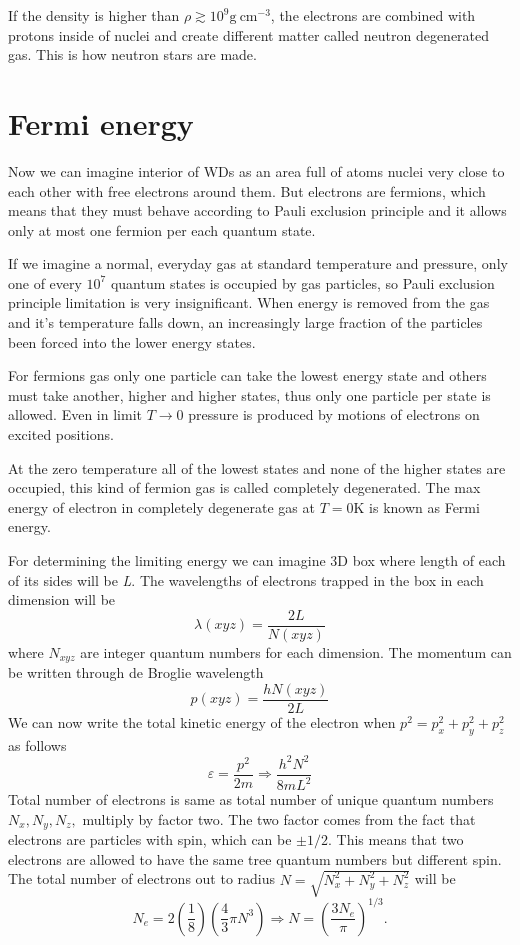 \documentclass[oneside,a4paper,11pt]{report}
\begin{document}
If the density is higher than $\rho \gtrsim 10^9 \mathrm{g\:cm^{-3}} $, the electrons are combined with protons inside of nuclei and 
create different matter called neutron degenerated gas. This is how neutron stars are made.    
 
\section{Fermi energy}
Now we can imagine interior of WDs as an area full of atoms nuclei very close to each other 
with free electrons around them. But electrons are fermions, which means that they must 
behave according to Pauli exclusion principle and it allows only at most one fermion 
per each quantum state. 

If we imagine a normal, everyday gas at standard temperature and pressure, only one 
of every $10^7$ quantum states is occupied by gas particles, so Pauli exclusion 
principle limitation is very insignificant. When energy is removed from the gas and 
it's temperature falls down, an increasingly large fraction of  the particles been 
forced into the lower energy states.

For fermions gas only one particle can take the lowest energy state and others must 
take another, higher and higher states, thus only one particle per state is allowed. 
Even in limit $T\rightarrow0$ pressure is produced by motions of electrons on excited positions.       

At the zero temperature all of the lowest states and none of the higher states are 
occupied, this kind of fermion gas is called completely degenerated. 
The max energy of electron in completely degenerate gas at $T=0 \mathrm{K}$ is known as Fermi energy. 

For determining the limiting energy we can imagine 3D box where length of each of its sides will be \textit{L}.  
The wavelengths of electrons trapped in the box in each dimension will be
\begin{equation}
\lambda (xyz) = \frac{2L}{N{(xyz)}}
\end{equation}
where $N_{xyz}$ are integer quantum numbers for each dimension. The momentum can be written 
through de Broglie wavelength
\begin{equation}
p(xyz) = \frac{hN(xyz)}{2L}
\end{equation}
We can now write the total kinetic energy of the electron when $p^2 = p_x^2 + p_y^2 + p_z^2$ as follows
\begin{equation}
\label{ferm1}
 \varepsilon =  \frac{p^2}{2m} \Rightarrow \frac{h^2N^2}{8mL^2}
\end{equation}
Total number of electrons is same as total number of unique quantum numbers $N_x, N_y, N_z,$ multiply by 
factor two. The two factor comes from the fact that electrons are particles with spin, which can be $\pm 1/2$. 
This means that two electrons are allowed to have the same tree quantum numbers but different spin. 
The total number of electrons out to radius $N = \sqrt{N_x^2 + N_y^2 + N_z^2}$ will be
\begin{equation}
 N_e = 2\left ( \frac{1}{8} \right )\left ( \frac{4}{3} \pi N^3\right ) \Rightarrow N = \left ( \frac{3N_e}{\pi} \right )^{1/3} .
\end{equation}
\end{document}
